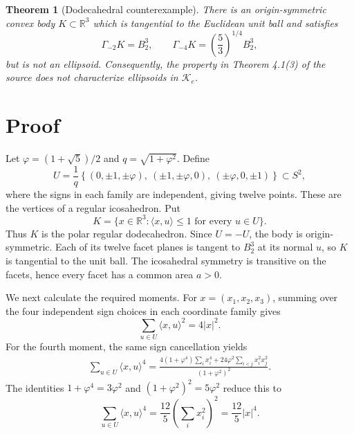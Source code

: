 \documentclass[11pt]{article}
\newtheorem{theorem}{Theorem}
\newcommand{\Gm}[1]{\Gamma_{-#1}}
\newcommand{\R}{\mathbb R}
\begin{document}
\begin{theorem}[Dodecahedral counterexample]\label{thm:main}
There is an origin-symmetric convex body $K\subset\R^3$ which is tangential to
the Euclidean unit ball and satisfies
\[
 \Gm2K=B_2^3,
 \qquad
 \Gm4K=\left(\frac53\right)^{1/4}B_2^3,
\]
but is not an ellipsoid. Consequently, the property in Theorem 4.1(3) of the
source does not characterize ellipsoids in $\mathcal K_e$.
\end{theorem}

\section{Proof}

Let $\varphi=(1+\sqrt5)/2$ and $q=\sqrt{1+\varphi^2}$. Define
\[
 U=\frac1q\left\{
 (0,\pm1,\pm\varphi),\ (\pm1,\pm\varphi,0),\
 (\pm\varphi,0,\pm1)
 \right\}\subset S^2,
\]
where the signs in each family are independent, giving twelve points. These
are the vertices of a regular icosahedron. Put
\[
 K=\{x\in\R^3:\langle x,u\rangle\leq1\text{ for every }u\in U\}.
\]
Thus $K$ is the polar regular dodecahedron. Since $U=-U$, the body is
origin-symmetric. Each of its twelve facet planes is tangent to $B_2^3$ at its
normal $u$, so $K$ is tangential to the unit ball. The icosahedral symmetry is
transitive on the facets, hence every facet has a common area $a>0$.

We next calculate the required moments. For $x=(x_1,x_2,x_3)$, summing over
the four independent sign choices in each coordinate family gives
\begin{equation}\label{eq:second-moment}
 \sum_{u\in U}\langle x,u\rangle^2=4|x|^2.
\end{equation}
For the fourth moment, the same sign cancellation yields
\begin{align*}
 \sum_{u\in U}\langle x,u\rangle^4
 =\frac{4(1+\varphi^4)\sum_i x_i^4
 +24\varphi^2\sum_{i<j}x_i^2x_j^2}{(1+\varphi^2)^2}.
\end{align*}
The identities $1+\varphi^4=3\varphi^2$ and
$(1+\varphi^2)^2=5\varphi^2$ reduce this to
\begin{equation}\label{eq:fourth-moment}
 \sum_{u\in U}\langle x,u\rangle^4
 =\frac{12}{5}\left(\sum_i x_i^2\right)^2
 =\frac{12}{5}|x|^4.
\end{equation}
\end{document}
